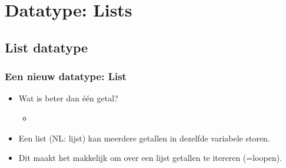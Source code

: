 \section{Datatype: Lists}

\subsection{List datatype}

\begin{frame}
\frametitle{Een nieuw datatype: List}

\begin{itemize}
  \item<1-> Wat is beter dan \'e\'en getal?
  \begin{itemize}
    \item<2-> 
  \end{itemize}
  \item<3-> Een list (NL: lijst) kan meerdere getallen in dezelfde variabele storen.
  \item<4-> Dit maakt het makkelijk om over een lijst getallen te itereren (=loopen).
\end{itemize}

\end{frame}





